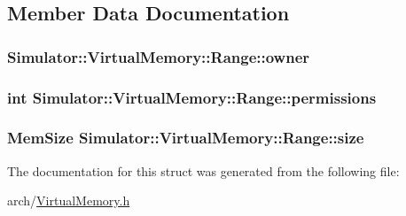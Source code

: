 \subsection{Member Data Documentation}
\hypertarget{struct_simulator_1_1_virtual_memory_1_1_range_a26a903ca1cb0e4f2db8c16e1ee7b5ff2}{
\subsubsection[{owner}]{ Simulator\+::\+Virtual\+Memory\+::\+Range\+::owner}}\label{struct_simulator_1_1_virtual_memory_1_1_range_a26a903ca1cb0e4f2db8c16e1ee7b5ff2}
\hypertarget{struct_simulator_1_1_virtual_memory_1_1_range_a5caf51ae0100604342e9080504893135}{
\subsubsection[{permissions}]{\setlength{\rightskip}{0pt plus 5cm}int Simulator\+::\+Virtual\+Memory\+::\+Range\+::permissions}}\label{struct_simulator_1_1_virtual_memory_1_1_range_a5caf51ae0100604342e9080504893135}
\hypertarget{struct_simulator_1_1_virtual_memory_1_1_range_afc3153d6fb01169307afebb8b36d021f}{
\subsubsection[{size}]{\setlength{\rightskip}{0pt plus 5cm}Mem\+Size Simulator\+::\+Virtual\+Memory\+::\+Range\+::size}}\label{struct_simulator_1_1_virtual_memory_1_1_range_afc3153d6fb01169307afebb8b36d021f}


The documentation for this struct was generated from the following file\+:\begin{DoxyCompactItemize}
\item 
arch/\hyperlink{_virtual_memory_8h}{Virtual\+Memory.\+h}\end{DoxyCompactItemize}
